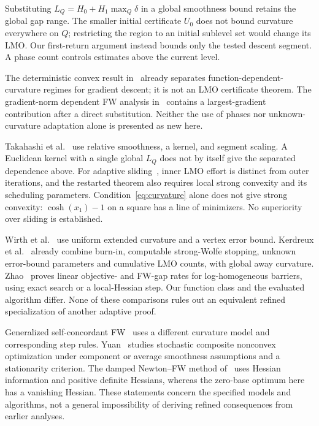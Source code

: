Substituting $L_Q=H_0+H_1\max_Q\delta$ in a global smoothness bound
retains the global gap range. The smaller initial certificate $U_0$
does not bound curvature everywhere on $Q$; restricting the region
to an initial sublevel set would change its LMO.
Our first-return argument instead bounds only the tested descent
segment. A phase count controls estimates above the current level.

The deterministic convex result in~\cite[Appendix C.4]{lobanovkoloskova}
already separates function-dependent-curvature regimes for gradient
descent; it is not an LMO certificate theorem.
The gradient-norm dependent FW analysis in~\cite[Theorem 5.1]{vyguzov}
contains a largest-gradient contribution after a direct substitution.
Neither the use of phases nor unknown-curvature adaptation alone
is presented as new here.

Takahashi et al.~\cite{bregmanfw} use relative smoothness, a kernel,
and segment scaling. A Euclidean kernel with a single global $L_Q$
does not by itself give the separated dependence above.
For adaptive sliding~\cite[Theorems 2.1 and 4.1]{adcgs}, inner LMO
effort is distinct from outer iterations, and the restarted theorem
also requires local strong convexity and its scheduling parameters.
Condition~\eqref{eq:curvature} alone does not give strong convexity:
$\cosh(x_1)-1$ on a square has a line of minimizers.
No superiority over sliding is established.

Wirth et al.~\cite[Definition 2.3(b), Theorem 3.6]{wirth} use uniform
extended curvature and a vertex error bound. Kerdreux et
al.~\cite[Proposition 4.2, Theorem 5.1]{restartfw} already combine
burn-in, computable strong-Wolfe stopping, unknown error-bound
parameters and cumulative LMO counts, with global away curvature.
Zhao~\cite[Theorems 4.1--4.2]{zhao} proves linear objective- and
FW-gap rates for log-homogeneous barriers, using exact search or a
local-Hessian step. Our function class and the evaluated algorithm
differ. None of these comparisons rules out an equivalent refined
specialization of another adaptive proof.

Generalized self-concordant FW~\cite{selfconcordant} uses a different
curvature model and corresponding step rules. Yuan~\cite{alfcg} studies
stochastic composite nonconvex optimization under component or average
smoothness assumptions and a stationarity criterion. The damped
Newton--FW method of~\cite{newtonfw} uses Hessian information and
positive definite Hessians, whereas the zero-base optimum here has a
vanishing Hessian. These statements concern the specified models and
algorithms, not a general impossibility of deriving refined consequences
from earlier analyses.


